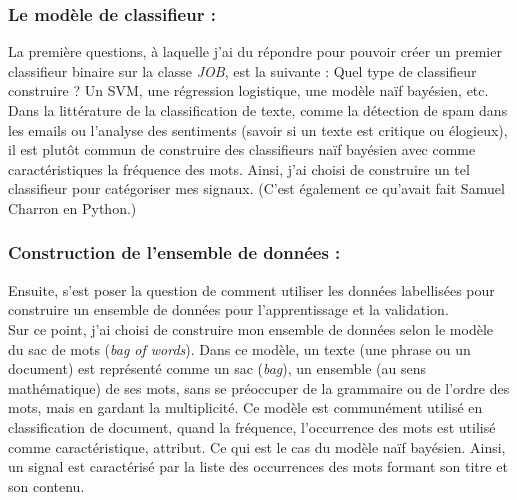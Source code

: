             \subsubsection{Le modèle de classifieur :}
                La première questions, à laquelle j'ai du répondre pour pouvoir créer un premier classifieur binaire sur la classe \textit{JOB}, est la suivante : Quel type de classifieur construire ? Un SVM, une régression logistique, une modèle naïf bayésien, etc.\\
                Dans la littérature de la classification de texte, comme la détection de spam dans les emails ou l'analyse des sentiments (savoir si un texte est critique ou élogieux), il est plutôt commun de construire des classifieurs naïf bayésien avec comme caractéristiques la fréquence des mots. Ainsi, j'ai choisi de construire un tel classifieur pour catégoriser mes signaux. (C'est également ce qu'avait fait Samuel Charron en Python.)

            \subsubsection{Construction de l'ensemble de données :}
                Ensuite, s'est poser la question de comment utiliser les données labellisées pour construire un ensemble de données pour l'apprentissage et la validation.\\
                Sur ce point, j'ai choisi de construire mon ensemble de données selon le modèle du sac de mots (\textit{bag of words}). Dans ce modèle, un texte (une phrase ou un document) est représenté comme un sac (\textit{bag}), un ensemble (au sens mathématique) de ses mots, sans se préoccuper de la grammaire ou de l'ordre des mots, mais en gardant la multiplicité. Ce modèle est communément utilisé en classification de document, quand la fréquence, l’occurrence des mots est utilisé comme caractéristique, attribut. Ce qui est le cas du modèle naïf bayésien. Ainsi, un signal est caractérisé par la liste des occurrences des mots formant son titre et son contenu.

